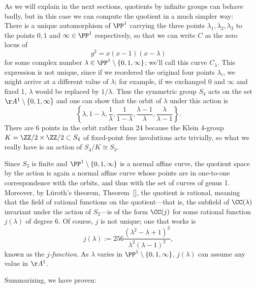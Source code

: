 As we will explain in the next sections, quotients by infinite groups can behave badly,
but in this case we can compute the quotient in a much simpler way:
There is a unique automorphism of $\PP^1$ carrying the three points $\lambda_1, \lambda_2,\lambda_3$ to the points $0, 1$ and $\infty \in \PP^1$ respectively, so that we can write $C$ as the zero locus of
$$
y^2 = x(x-1)(x-\lambda)
$$
for some complex number $\lambda  \in \PP^1 \setminus \{0,1,\infty\}$; we'll call this curve $C_\lambda$. 
This expression is not unique, since if we reordered the original  four points $\lambda_i$, we might arrive at a different value of $\lambda$; for example, if we exchanged 0 and $\infty$ and fixed 1, $\lambda$ would be replaced by $1/\lambda$. Thus the symmetric group $S_4$ acts on the set $\AA^1 \setminus \{0,1,\infty\}$
and one can show that the orbit of $\lambda$ under this action is
$$
 \left\{ \lambda, 1-\lambda, \frac{1}{\lambda}, \frac{1}{1-\lambda}, \frac{\lambda-1}{\lambda}, \frac{\lambda}{\lambda - 1} \right\}.
$$
There are 6 points in the orbit rather than 24 because the Klein 4-group
$K = \ZZ/2\times \ZZ/2 \subset S_4$ of fixed-point free involutions acts trivially, so what we really have is an action of $S_4/K \cong S_3$.

Since $S_3$ is finite and $\PP^1 \setminus \{0,1,\infty\}$ is a normal affine curve, the quotient space by the action is again a normal affine curve whose points are in one-to-one
correspondence with the orbits, and thus with the set of curves of genus 1. 
 Moreover, by L\"uroth's theorem, Theorem~\ref{}, the quotient is rational, meaning that the field of rational functions on the quotient---that is, the subfield of $\CC(\lambda)$ invariant under the action of $S_3$---is of the form $\CC(j)$ for some rational function $j(\lambda)$ of degree 6. Of course, $j$ is not unique; one that works is
\begin{equation}\label{formula for j}
j(\lambda) := 256\frac{(\lambda^2-\lambda + 1)^3}{\lambda^2(\lambda-1)^2},
\end{equation}
known as the \emph{$j$-function}. As $\lambda$ varies in $\PP^1 \setminus \{0,1,\infty\}$, $j(\lambda)$ can assume any value in $\AA^1$.
 
 

Summarizing, we have proven:

